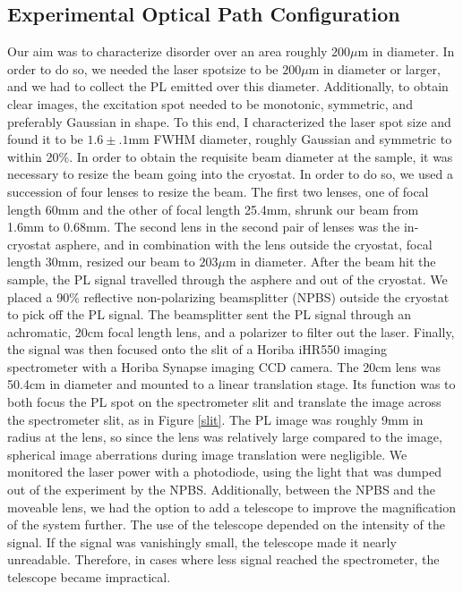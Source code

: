 \subsection{Experimental Optical Path Configuration}
\indent Our aim was to characterize disorder over an area roughly $200\mu$m in diameter. In order to do so, we needed the laser spotsize to be $200\mu$m in diameter or larger, and we had to collect the PL emitted over this diameter. Additionally, to obtain clear images, the excitation spot needed to be monotonic, symmetric, and preferably Gaussian in shape. To this end, I characterized the laser spot size and found it to be $1.6\pm.1$mm FWHM diameter, roughly Gaussian and symmetric to within 20\%. In order to obtain the requisite beam diameter at the sample, it was necessary to resize the beam going into the cryostat. In order to do so, we used a succession of four lenses to resize the beam. The first two lenses, one of focal length 60mm and the other of focal length 25.4mm, shrunk our beam from 1.6mm to 0.68mm. The second lens in the second pair of lenses was the in-cryostat asphere, and in combination with the lens outside the cryostat, focal length 30mm, resized our beam to $203\mu$m in diameter. After the beam hit the sample, the PL signal travelled through the asphere and out of the cryostat. We placed a 90\% reflective non-polarizing beamsplitter (NPBS) outside the cryostat to pick off the PL signal. The beamsplitter sent the PL signal through an achromatic, 20cm focal length lens, and a polarizer to filter out the laser. Finally, the signal was then focused onto the slit of a Horiba iHR550 imaging spectrometer with a Horiba Synapse imaging CCD camera. The 20cm lens was 50.4cm in diameter and mounted to a linear translation stage. Its function was to both focus the PL spot on the spectrometer slit and translate the image across the spectrometer slit, as in Figure \ref{slit}. The PL image was roughly 9mm in radius at the lens, so since the lens was relatively large compared to the image, spherical image aberrations during image translation were negligible.
\indent We monitored the laser power with a photodiode, using the light that was dumped out of the experiment by the NPBS. Additionally, between the NPBS and the moveable lens, we had the option to add a telescope to improve the magnification of the system further. The use of the telescope depended on the intensity of the signal. If the signal was vanishingly small, the telescope made it nearly unreadable. Therefore, in cases where less signal reached the spectrometer, the telescope became impractical.

